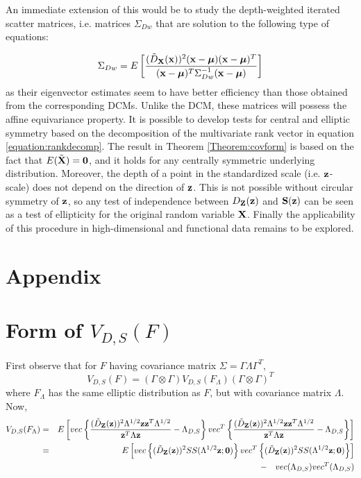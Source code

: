 \documentclass[fleqn,11pt]{article}
\begin{document}
An immediate extension of this would be to study the depth-weighted iterated scatter matrices, i.e. matrices $\Sigma_{Dw}$ that are solution to the following type of equations:

$$ \Sigma_{Dw} = E \left[ \frac{(\tilde D_{\mathbf{X}}({\bf{x}}))^2 ({\bf{x}} - {\boldsymbol{\mu}}) ({\bf{x}} - {\boldsymbol{\mu}})^T}{({\bf{x}} - {\boldsymbol{\mu}})^T \Sigma_{Dw}^{-1} ({\bf{x}} - {\boldsymbol{\mu}})} \right] $$
as their eigenvector estimates seem to have better efficiency than those obtained from the corresponding DCMs. Unlike the DCM, these matrices will possess the affine equivariance property. It is possible to develop tests for central and elliptic symmetry based on the decomposition of the multivariate rank vector in equation \ref{equation:rankdecomp}. The result in Theorem \ref{Theorem:covform} is based on the fact that $E(\tilde {{\mathbf{X}}}) = \bf0$, and it holds for any centrally symmetric underlying distribution. Moreover, the depth of a point in the standardized scale (i.e. ${\bf{z}}$-scale) does not depend on the direction of ${\bf{z}}$. This is not possible without circular symmetry of ${\bf{z}}$, so any test of independence between $D_{\mathbf{Z}} ({\bf{z}})$ and ${\mathbf{S}} ({\bf{z}})$ can be seen as a test of ellipticity for the original random variable ${\mathbf{X}}$. Finally the applicability of this procedure in high-dimensional and functional data remains to be explored.

\appendix
\section*{Appendix}
\section{\textbf{Form of $V_{D,S}(F)$}}\label{section:appA}

First observe that for $F$ having covariance matrix $\Sigma = \Gamma\Lambda\Gamma^T$,
%
$$ V_{D,S}(F)  = (\Gamma \otimes \Gamma) V_{D,S}(F_\Lambda) (\Gamma \otimes \Gamma)^T$$
%
where $F_\Lambda$ has the same elliptic distribution as $F$, but with covariance matrix $\Lambda$. Now,
%
\begin{eqnarray*}
V_{D,S} (F_\Lambda) &=& E \left[ vec \left\{ \frac{(\tilde D_{\mathbf{Z}} ({\bf{z}}))^2 \Lambda^{1/2} {\bf{z}}{\bf{z}}^T \Lambda^{1/2}}{{\bf{z}}^T\Lambda{\bf{z}}} - \Lambda_{D,S} \right\} vec^T \left\{ \frac{(\tilde D_{\mathbf{Z}} ({\bf{z}}))^2 \Lambda^{1/2} {\bf{z}}{\bf{z}}^T \Lambda^{1/2}}{{\bf{z}}^T\Lambda{\bf{z}}} - \Lambda_{D,S} \right\} \right]\\
&=& E \left[ vec \left\{ (\tilde D_{\mathbf{Z}} ({\bf{z}}))^2 SS(\Lambda^{1/2}{\bf{z}}; \bf0) \right\} vec^T \left\{ (\tilde D_{\mathbf{Z}} ({\bf{z}}))^2 SS(\Lambda^{1/2}{\bf{z}}; \bf0) \right\} \right]\\
&& - \quad vec(\Lambda_{D,S}) vec^T(\Lambda_{D,S})
\end{eqnarray*}
\end{document}
